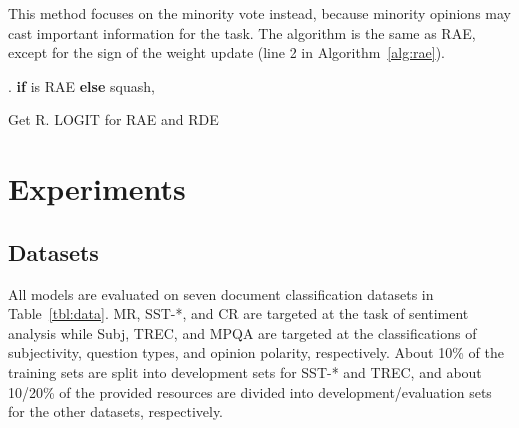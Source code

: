 \documentclass{article}
\begin{document}
This method focuses on the minority vote instead, because minority opinions may cast important information for the task.
The algorithm is the same as RAE, except for the sign of the weight update (line 2 in Algorithm~\ref{alg:rae}).

\begin{algorithm}[hbtp!]{
	\small
	\SetAlgoLined
    \SetAlgoVlined
    \DontPrintSemicolon
	.
 \textbf{if} { is RAE} \textbf{else} {}\;
\For{}
	{
		 squash, 		\;
	}
	\Return 
	\caption{\small Get R. LOGIT for RAE and RDE}
	\label{alg:rae}
}
\end{algorithm}








 \section{Experiments}
\label{sec:experiment}
\subsection{Datasets}
All models are evaluated on seven document classification datasets in Table~\ref{tbl:data}.
MR, SST-*, and CR are targeted at the task of sentiment analysis while Subj, TREC, and MPQA are targeted at the classifications of subjectivity, question types, and opinion polarity, respectively.
About 10\% of the training sets are split into development sets for SST-* and TREC, and about 10/20\% of the provided resources are divided into development/evaluation sets for the other datasets, respectively.
\end{document}

